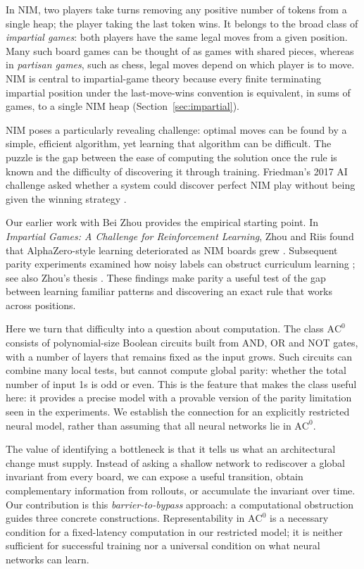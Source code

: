 \documentclass[twoside,11pt]{article}
\newcommand{\AC}{\mathrm{AC}}
\numberwithin{theorem}{section}
\numberwithin{equation}{section}
\begin{document}
In NIM, two players take turns removing any positive number of tokens from a single heap; the player taking the last token wins. It belongs to the broad class of \emph{impartial games}: both players have the same legal moves from a given position. Many such board games can be thought of as games with shared pieces, whereas in \emph{partisan games}, such as chess, legal moves depend on which player is to move. NIM is central to impartial-game theory because every finite terminating impartial position under the last-move-wins convention is equivalent, in sums of games, to a single NIM heap (Section~\ref{sec:impartial}).

NIM poses a particularly revealing challenge: optimal moves can be found by a simple, efficient algorithm, yet learning that algorithm can be difficult. The puzzle is the gap between the ease of computing the solution once the rule is known and the difficulty of discovering it through training. Friedman's 2017 AI challenge asked whether a system could discover perfect NIM play without being given the winning strategy \citep{friedman2017challenge}.

Our earlier work with Bei Zhou provides the empirical starting point. In \emph{Impartial Games: A Challenge for Reinforcement Learning}, Zhou and Riis found that AlphaZero-style learning deteriorated as NIM boards grew \citep{zhou2022impartial}. Subsequent parity experiments examined how noisy labels can obstruct curriculum learning \citep{zhou2023parity}; see also Zhou's thesis \citep{zhou2024phd}. These findings make parity a useful test of the gap between learning familiar patterns and discovering an exact rule that works across positions.

Here we turn that difficulty into a question about computation. The class $\AC^0$ consists of polynomial-size Boolean circuits built from AND, OR and NOT gates, with a number of layers that remains fixed as the input grows. Such circuits can combine many local tests, but cannot compute global parity: whether the total number of input 1s is odd or even. This is the feature that makes the class useful here: it provides a precise model with a provable version of the parity limitation seen in the experiments. We establish the connection for an explicitly restricted neural model, rather than assuming that all neural networks lie in $\AC^0$.

The value of identifying a bottleneck is that it tells us what an architectural change must supply. Instead of asking a shallow network to rediscover a global invariant from every board, we can expose a useful transition, obtain complementary information from rollouts, or accumulate the invariant over time. Our contribution is this \emph{barrier-to-bypass} approach: a computational obstruction guides three concrete constructions. Representability in $\AC^0$ is a necessary condition for a fixed-latency computation in our restricted model; it is neither sufficient for successful training nor a universal condition on what neural networks can learn.
\end{document}
